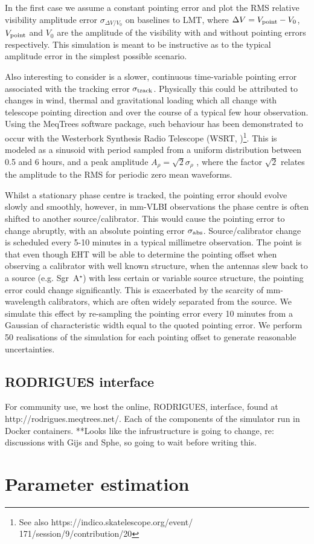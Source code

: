 In the first case we assume a constant pointing error and plot the RMS relative visibility amplitude error $\sigma_{\Delta V/V_0}$ on baselines to LMT, where $\Delta V = V_{\rm point} - V_{0}$, $V_{\rm point}$ and $V_{0}$ are the amplitude of the visibility with and without pointing errors respectively. This simulation is meant to be instructive as to the typical amplitude error in the simplest possible scenario.


Also interesting to consider is a slower, continuous time-variable pointing error associated with the tracking error $\sigma_{\rm track}$. Physically this could be attributed to changes in wind, thermal and gravitational loading which all change with telescope pointing direction and over the course of a typical few hour observation. Using the MeqTrees software package, such behaviour has been demonstrated to occur with the Westerbork Synthesis Radio Telescope (WSRT, \cite{Smirnov_2011c})\footnote{See also https://indico.skatelescope.org/event/\\171/session/9/contribution/20}. This is modeled as a sinusoid with period sampled from a uniform distribution between 0.5 and 6 hours, and a peak amplitude $A_{\rho} = \sqrt{2} \sigma_{\rho}$ , where the factor $\sqrt{2}$ relates the amplitude to the RMS for periodic zero mean waveforms. 


Whilst a stationary phase centre is tracked, the pointing error should evolve slowly and smoothly, however, in mm-VLBI observations the phase centre is often shifted to another source/calibrator. This would cause the pointing error to change abruptly, with an absolute pointing error $\sigma_{\rm abs}$. Source/calibrator change is scheduled every 5-10 minutes in a typical millimetre observation. The point is that even though EHT will be able to determine the pointing offset when observing a calibrator with well known structure, when the antennas slew back to a source (e.g. Sgr~A$^\star$) with less certain or variable source structure, the pointing error could change significantly. This is exacerbated by the scarcity of mm-wavelength calibrators, which are often widely separated from the source. We simulate this effect by re-sampling the pointing error every 10 minutes from a Gaussian of characteristic width equal to the quoted pointing error. We perform 50 realisations of the simulation for each pointing offset to generate reasonable uncertainties.
\subsection{RODRIGUES interface}
For community use, we host the online, RODRIGUES, interface, found at http://rodrigues.meqtrees.net/. Each of the components of the simulator run in Docker containers. **Looks like the infrustructure is going to change, re: discussions with Gijs and Sphe, so going to wait before writing this.

\section{Parameter estimation}
